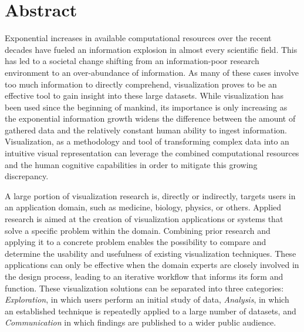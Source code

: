 \chapter*{Abstract}

Exponential increases in available computational resources over the recent decades have fueled an information explosion in almost every scientific field.  This has led to a societal change shifting from an information-poor research environment to an over-abundance of information.  As many of these cases involve too much information to directly comprehend, visualization proves to be an effective tool to gain insight into these large datasets.  While visualization has been used since the beginning of mankind, its importance is only increasing as the exponential information growth widens the difference between the amount of gathered data and the relatively constant human ability to ingest information.  Visualization, as a methodology and tool of transforming complex data into an intuitive visual representation can leverage the combined computational resources and the human cognitive capabilities in order to mitigate this growing discrepancy.

A large portion of visualization research is, directly or indirectly, targets users in an application domain, such as medicine, biology, physics, or others.  Applied research is aimed at the creation of visualization applications or systems that solve a specific problem within the domain.  Combining prior research and applying it to a concrete problem enables the possibility to compare and determine the usability and usefulness of existing visualization techniques.  These applications can only be effective when the domain experts are closely involved in the design process, leading to an iterative workflow that informs its form and function.  These visualization solutions can be separated into three categories:  \emph{Exploration}, in which users perform an initial study of data, \emph{Analysis}, in which an established technique is repeatedly applied to a large number of datasets, and \emph{Communication} in which findings are published to a wider public audience.

